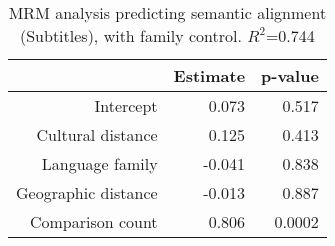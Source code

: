 \begin{table}[ht]
\centering
\begin{tabular}{rrr}
  \hline
 & Estimate & p-value \\ 
  \hline
Intercept & 0.073 & 0.517 \\ 
  Cultural distance & 0.125 & 0.413 \\ 
  Language family & -0.041 & 0.838 \\ 
  Geographic distance & -0.013 & 0.887 \\ 
  Comparison count & 0.806 & 0.0002 \\ 
   \hline
\end{tabular}
\caption{MRM analysis predicting semantic alignment (Subtitles), with family control. $R^2$=0.744} 
\end{table}
